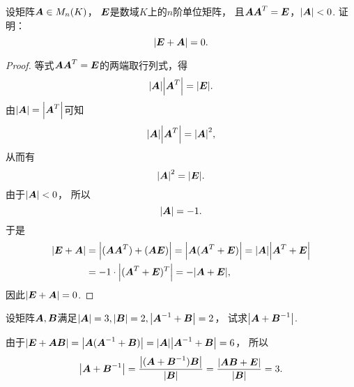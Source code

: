 \begin{example}\label{example:正交矩阵.行列式小于零的正交矩阵与单位矩阵之和的行列式等于零}
设矩阵\(\boldsymbol{A} \in M_n(K)\)，
\(\boldsymbol{E}\)是数域\(K\)上的\(n\)阶单位矩阵，
且\(\boldsymbol{A} \boldsymbol{A}^T = \boldsymbol{E}\)，\(\abs{\boldsymbol{A}}<0\).
证明：\begin{equation*}
	\abs{\boldsymbol{E}+\boldsymbol{A}}=0.
\end{equation*}
\begin{proof}
等式\(\boldsymbol{A} \boldsymbol{A}^T=\boldsymbol{E}\)的两端取行列式，得\begin{equation*}
	\abs{\boldsymbol{A}} \abs{\boldsymbol{A}^T}
	= \abs{\boldsymbol{E}}.
\end{equation*}
由\(\abs{\boldsymbol{A}} = \abs{\boldsymbol{A}^T}\)可知\begin{equation*}
	\abs{\boldsymbol{A}} \abs{\boldsymbol{A}^T}
	= \abs{\boldsymbol{A}}^2,
\end{equation*}
从而有\begin{equation*}
	\abs{\boldsymbol{A}}^2 = \abs{\boldsymbol{E}}.
\end{equation*}
由于\(\abs{\boldsymbol{A}} < 0\)，
所以\begin{equation*}
	\abs{\boldsymbol{A}} = -1.
\end{equation*}
于是\begin{align*}
	\abs{\boldsymbol{E}+\boldsymbol{A}}
	&= \abs{(\boldsymbol{A} \boldsymbol{A}^T)+(\boldsymbol{A} \boldsymbol{E})}
	= \abs{\boldsymbol{A}(\boldsymbol{A}^T+\boldsymbol{E})}
	= \abs{\boldsymbol{A}} \abs{\boldsymbol{A}^T+\boldsymbol{E}} \\
	&= -1 \cdot \abs{(\boldsymbol{A}^T+\boldsymbol{E})^T}
	= -\abs{\boldsymbol{A}+\boldsymbol{E}},
\end{align*}
因此\(\abs{\boldsymbol{E}+\boldsymbol{A}}=0\).
\end{proof}
\end{example}

\begin{example}
设矩阵\(\boldsymbol{A},\boldsymbol{B}\)满足\(\abs{\boldsymbol{A}}=3,\abs{\boldsymbol{B}}=2,\abs{\boldsymbol{A}^{-1}+\boldsymbol{B}}=2\)，
试求\(\abs{\boldsymbol{A}+\boldsymbol{B}^{-1}}\).
\begin{solution}
由于\(\abs{\boldsymbol{E}+\boldsymbol{A}\boldsymbol{B}} = \abs{\boldsymbol{A}(\boldsymbol{A}^{-1}+\boldsymbol{B})} = \abs{\boldsymbol{A}} \abs{\boldsymbol{A}^{-1}+\boldsymbol{B}} = 6\)，
所以\begin{equation*}
	\abs{\boldsymbol{A}+\boldsymbol{B}^{-1}}
	= \frac{\abs{(\boldsymbol{A}+\boldsymbol{B}^{-1})\boldsymbol{B}}}{\abs{\boldsymbol{B}}}
	= \frac{\abs{\boldsymbol{A}\boldsymbol{B}+\boldsymbol{E}}}{\abs{\boldsymbol{B}}}
	= 3.
\end{equation*}
\end{solution}
\end{example}

